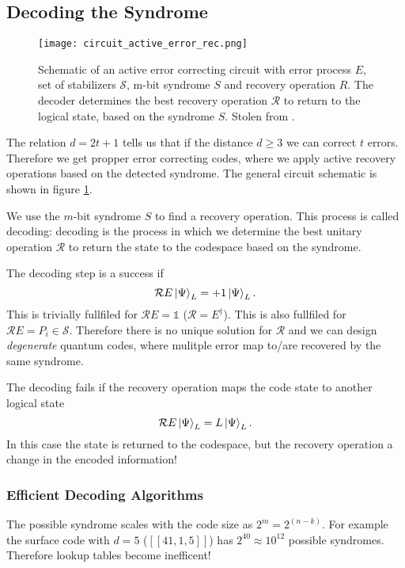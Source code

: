 \subsection{Decoding the Syndrome}
\begin{figure}[h]
    \begin{center}
        \texttt{[image: circuit\_active\_error\_rec.png]}
    \end{center}
    \caption{
    Schematic of an active error correcting circuit with error process $E$, set of stabilizers $\mathcal{S}$, m-bit syndrome $S$ and recovery operation $R$.
    The decoder determines the best recovery operation $\mathcal{R}$ to return to the logical state, based on the syndrome $S$.
    Stolen from \cite{QECintro}.
    }
    \label{fig:basic.qc.qec_circuit}
\end{figure}
The relation $d = 2t+1$ tells us that if the distance $d\ge 3$ we can correct $t$ errors.
Therefore we get propper error correcting codes, where we apply active recovery operations based on the detected syndrome.
The general circuit schematic is shown in figure \ref{fig:basic.qc.qec_circuit}. \cite{QECintro}

We use the $m$-bit syndrome $S$ to find a recovery operation. 
This process is called decoding: 
decoding is the process in which we determine the best unitary operation $\mathcal{R}$ to return the state to the codespace based on the syndrome. \cite{QECintro}

The decoding step is a success if 
\begin{equation}
    \mathcal{R}E \ket{\Psi}_L = +1 \ket{\Psi}_L.
\end{equation}
This is trivially fullfiled for $\mathcal{R}E=\mathds{1}$ ($\mathcal{R}=E^\dagger$). 
This is also fullfiled for $\mathcal{R}E=P_i \in \mathcal{S}$.
Therefore there is no unique solution for $\mathcal{R}$ and we can design \textit{degenerate} quantum codes,
where mulitple error map to/are recovered by the same syndrome. \cite{QECintro}

The decoding fails if the recovery operation maps the code state to another logical state
\begin{equation}
    \mathcal{R}E \ket{\Psi}_L = L\ket{\Psi}_L.
\end{equation}
In this case the state is returned to the codespace, 
but the recovery operation a change in the encoded information! \cite{QECintro}


\subsubsection{Efficient Decoding Algorithms}
The possible syndrome scales with the code size as $2^m = 2^(n-k)$.
For example the surface code with $d=5$ ($[[41,1,5]]$) has $2^40\approx 10^12$ possible syndromes. 
Therefore lookup tables become inefficent! \cite{QECintro}

